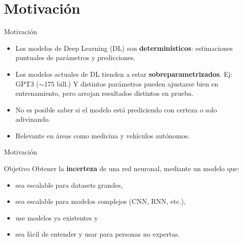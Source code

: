 \section{Motivación}
\begin{frame}{Motivación}
    
   \begin{itemize}[<+->]
       \item Los modelos de Deep Learning (DL) son \textbf{determinísticos}: estimaciones puntuales de parámetros y predicciones.
       \item Los modelos actuales de DL tienden a estar \textbf{sobreparametrizados}. Ej: GPT3 ($\sim$175 bill.) Y distintos parámetros pueden ajustarse bien en entrenamiento, pero arrojan resultados distintos en prueba. 
       \item No es posible saber si el modelo está prediciendo con certeza o solo adivinando.
       \item Relevante en áreas como medicina y vehículos autónomos.
       
       
   \end{itemize}
\end{frame}

\begin{frame}{Motivación}



   
\end{frame}

\begin{frame}{Objetivo}
    Obtener la \textbf{incerteza} de una red neuronal, mediante un modelo que:
    \begin{itemize}
        \item sea escalable para datasets grandes,
        \item sea escalable para modelos complejos (CNN, RNN, etc.),
        \item use modelos ya existentes y
        \item sea fácil de entender y usar para personas no expertas.
    \end{itemize}
\end{frame}


